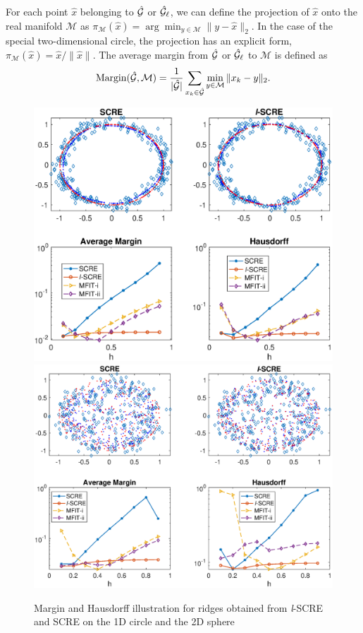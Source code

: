 \documentclass[aos,preprint]{imsart}
\theoremstyle{remark}
\begin{document}
For each point $\hat{x}$ belonging to ${\cal \hat{G}}$ or ${\cal \hat{G}}_\ell$, we can define the projection of $\hat{x}$ onto the real manifold $\mathcal M$ as $\pi_{\mathcal M}(\hat{x}) = \arg\min_{y\in \mathcal M} \|y-\hat{x}\|_2$. In the case of the special two-dimensional circle, the projection has an explicit form, $\pi_{\mathcal M}(\hat{x}) = \hat{x}/\|\hat{x}\|$. The average margin from $\cal \hat{G}$ or ${ \cal \hat{G}}_\ell$ to $\mathcal M$ is defined as
\[
{\rm Margin}({ \cal \hat{G}, \mathcal M}) =\frac{1}{|{\cal \hat{G}}|}  \sum_{x_k\in  {\cal \hat{G}}} \min_{y\in \mathcal M}\|x_k-y\|_2.
\]
\begin{figure}[h] %
   \includegraphics[width=\linewidth]{circle9.eps} 
   \includegraphics[width=\linewidth]{sphere8n.eps} 
   \vspace{-1cm}
   \caption{Margin and Hausdorff illustration for ridges obtained from {\it l}-SCRE and SCRE on the 1D circle and the 2D sphere}
   \label{fig:circle6}
\end{figure}
\end{document}
